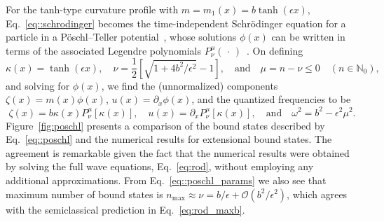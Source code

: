 For the tanh-type curvature profile with $m = m_{1}(x) = b\tanh(\epsilon x)$, Eq.~\eqref{eq::schrodinger} becomes the time-independent Schr\"{o}dinger equation for a particle in a P\"{o}schl--Teller potential~\cite{poschl1933,rosen1932}, whose solutions $\phi(x)$ can be written in terms of the associated Legendre polynomials $P^{\mu}_{\nu}(\,\cdot\,)$~\cite{olver2010}.
On defining
%
\begin{equation}
  \kappa(x) = \tanh(\epsilon x),
  \quad
  \nu = \frac{1}{2}\left[\sqrt{1 + 4b^{2}/\epsilon^{2}} - 1\right],
  \quad\text{and}\quad
  \mu = n - \nu \leq 0
  \quad(n \in \mathbb{N}_{0}),
  \label{eq::poschl_params}
\end{equation}
%
and solving for $\phi(x)$, we find the (unnormalized) components $\zeta(x) = m(x)\phi(x)$, $u(x) = \partial_{x}\phi(x)$, and the quantized frequencies to be
%
\begin{equation}
  \zeta(x) = b\kappa(x)P^{\mu}_{\nu}\left[\kappa(x)\right],
  \quad
  u(x) = \partial_{x}P^{\mu}_{\nu}\left[\kappa(x)\right],
  \quad\text{and}\quad
  \omega^{2} = b^{2} - \epsilon^{2}\mu^{2}.
  \label{eq::poschl}
\end{equation}
%
Figure~\ref{fig:poschl} presents a comparison of the bound states described by Eq.~\eqref{eq::poschl} and the numerical results for extensional bound states.
The agreement is remarkable given the fact that the numerical results were obtained by solving the full wave equations, Eq.~\eqref{eq:rod}, without employing any additional approximations.
From Eq.~\eqref{eq::poschl_params} we also see that maximum number of bound states is $n_{\text{max}} \approx \nu = b/\epsilon + \mathcal{O}(b^{2}/\epsilon^{2})$, which agrees with the semiclassical prediction in Eq.~\eqref{eq:rod_maxb}.

